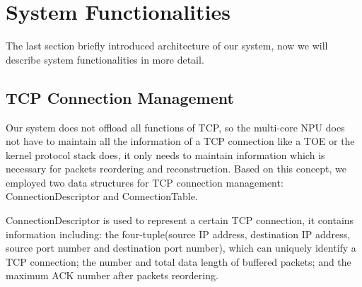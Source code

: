 \documentclass[conference]{IEEEtran}
\begin{document}
\section{System Functionalities}
The last section briefly introduced architecture of our system, now we will describe system functionalities in more detail.
\subsection{TCP Connection Management}
Our system does not offload all functions of TCP, so the multi-core NPU does not have to maintain all the information of a TCP connection like a TOE or the kernel protocol stack does, it only needs to maintain information which is necessary for packets reordering and reconstruction. Based on this concept, we employed two data structures for TCP connection management: ConnectionDescriptor and ConnectionTable.

ConnectionDescriptor is used to represent a certain TCP connection, it contains information including: the four-tuple(source IP address, destination IP address, source port number and destination port number), which can uniquely identify a TCP connection; the number and total data length of buffered packets; and the maximum ACK number after packets reordering.
\end{document}
